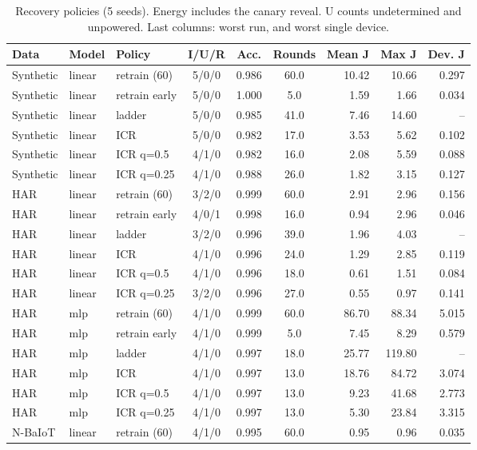 \begin{table}[h]
\centering
\caption{Recovery policies (5 seeds). Energy includes the canary reveal. U counts undetermined and unpowered. Last columns: worst run, and worst single device.}\label{tab:s_icr}
\footnotesize
\setlength{\tabcolsep}{3pt}
\begin{tabular}{@{}lllcccrrr@{}}
\toprule
Data & Model & Policy & I/U/R & Acc. & Rounds & Mean J & Max J & Dev. J \\
\midrule
Synthetic & linear & retrain (60) & 5/0/0 & 0.986 & 60.0 & 10.42 & 10.66 & 0.297 \\
Synthetic & linear & retrain early & 5/0/0 & 1.000 & 5.0 & 1.59 & 1.66 & 0.034 \\
Synthetic & linear & ladder & 5/0/0 & 0.985 & 41.0 & 7.46 & 14.60 & -- \\
Synthetic & linear & ICR & 5/0/0 & 0.982 & 17.0 & 3.53 & 5.62 & 0.102 \\
Synthetic & linear & ICR q=0.5 & 4/1/0 & 0.982 & 16.0 & 2.08 & 5.59 & 0.088 \\
Synthetic & linear & ICR q=0.25 & 4/1/0 & 0.988 & 26.0 & 1.82 & 3.15 & 0.127 \\
HAR & linear & retrain (60) & 3/2/0 & 0.999 & 60.0 & 2.91 & 2.96 & 0.156 \\
HAR & linear & retrain early & 4/0/1 & 0.998 & 16.0 & 0.94 & 2.96 & 0.046 \\
HAR & linear & ladder & 3/2/0 & 0.996 & 39.0 & 1.96 & 4.03 & -- \\
HAR & linear & ICR & 4/1/0 & 0.996 & 24.0 & 1.29 & 2.85 & 0.119 \\
HAR & linear & ICR q=0.5 & 4/1/0 & 0.996 & 18.0 & 0.61 & 1.51 & 0.084 \\
HAR & linear & ICR q=0.25 & 3/2/0 & 0.996 & 27.0 & 0.55 & 0.97 & 0.141 \\
HAR & mlp & retrain (60) & 4/1/0 & 0.999 & 60.0 & 86.70 & 88.34 & 5.015 \\
HAR & mlp & retrain early & 4/1/0 & 0.999 & 5.0 & 7.45 & 8.29 & 0.579 \\
HAR & mlp & ladder & 4/1/0 & 0.997 & 18.0 & 25.77 & 119.80 & -- \\
HAR & mlp & ICR & 4/1/0 & 0.997 & 13.0 & 18.76 & 84.72 & 3.074 \\
HAR & mlp & ICR q=0.5 & 4/1/0 & 0.997 & 13.0 & 9.23 & 41.68 & 2.773 \\
HAR & mlp & ICR q=0.25 & 4/1/0 & 0.997 & 13.0 & 5.30 & 23.84 & 3.315 \\
N-BaIoT & linear & retrain (60) & 4/1/0 & 0.995 & 60.0 & 0.95 & 0.96 & 0.035 \\

\end{tabular}
\end{table}
